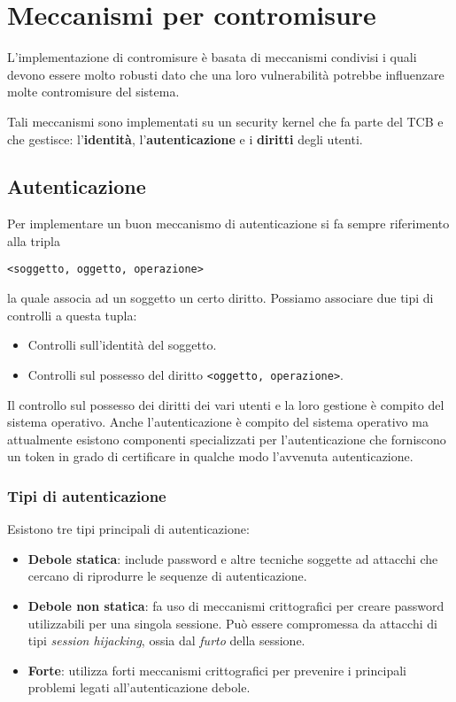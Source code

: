 \section{Meccanismi per contromisure}
L'implementazione di contromisure è basata di meccanismi condivisi i quali devono essere molto robusti dato che una
loro vulnerabilità potrebbe influenzare molte contromisure del sistema.

Tali meccanismi sono implementati su un security kernel che fa parte del TCB e che gestisce: l'\textbf{identità},
l'\textbf{autenticazione} e i \textbf{diritti} degli utenti.

\subsection{Autenticazione}
Per implementare un buon meccanismo di autenticazione si fa sempre riferimento alla tripla
\begin{center}
	\verb|<soggetto, oggetto, operazione>|
\end{center}
la quale associa ad un soggetto un certo diritto. Possiamo associare due tipi di controlli a questa tupla:
\begin{itemize}
	\item Controlli sull'identità del soggetto.
	\item Controlli sul possesso del diritto \verb|<oggetto, operazione>|.
\end{itemize}
Il controllo sul possesso dei diritti dei vari utenti e la loro gestione è compito del sistema operativo. Anche
l'autenticazione è compito del sistema operativo ma attualmente esistono componenti specializzati per l'autenticazione
che forniscono un token in grado di certificare in qualche modo l'avvenuta autenticazione.

\subsubsection{Tipi di autenticazione}
Esistono tre tipi principali di autenticazione:
\begin{itemize}
	\item \textbf{Debole statica}: include password e altre tecniche soggette ad attacchi che cercano di riprodurre
	      le sequenze di autenticazione.
	\item \textbf{Debole non statica}: fa uso di meccanismi crittografici per creare password utilizzabili per una
	      singola sessione. Può essere compromessa da attacchi di tipi \emph{session hijacking}, ossia dal
	      \emph{furto} della sessione.
	\item \textbf{Forte}: utilizza forti meccanismi crittografici per prevenire i principali problemi legati
	      all'autenticazione debole.
\end{itemize}

